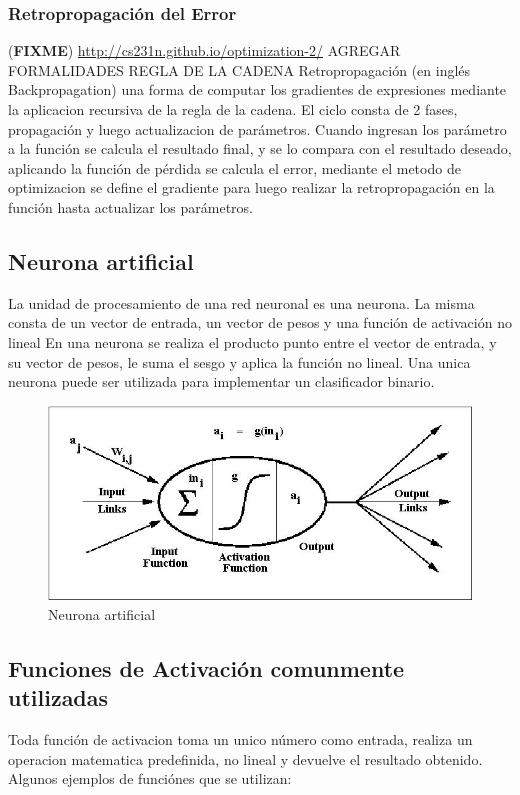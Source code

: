 \documentclass[a4paper,11pt,spanish]{book}
\newcommand*{\FIXME}[1]{{(\textbf{FIXME}) {#1}}}
\begin{document}
	\subsubsection{Retropropagación del Error}
	  \FIXME{\url{http://cs231n.github.io/optimization-2/} AGREGAR FORMALIDADES REGLA DE LA CADENA}
	  Retropropagación (en inglés Backpropagation) una forma  de computar los gradientes de expresiones mediante la aplicacion recursiva de la regla de la cadena.
	  El ciclo consta de 2 fases, propagación y luego actualizacion de parámetros. Cuando ingresan los parámetro a la función se calcula el resultado final, y se lo compara con el resultado
	  deseado, aplicando la función de pérdida se calcula el error, mediante el metodo de optimizacion se define el gradiente para luego realizar la retropropagación en la función hasta
	  actualizar los parámetros.

      \subsection {Neurona artificial}
	La unidad de procesamiento de una red neuronal es una neurona. La misma consta de un vector de entrada, un vector de pesos y una función de activación no lineal
	En una neurona se realiza el producto punto entre el vector de entrada, y su vector de pesos, le suma el sesgo y aplica la función no lineal.
	Una unica neurona puede ser utilizada para implementar un clasificador binario.
	\begin{figure}[H]
          \begin{center}
            \includegraphics[width=0.4\linewidth]{./img/neuron.jpg}
	  \caption{Neurona artificial}
          \end{center}
          \label{fig:neuron}
	\end{figure}


      \subsection {Funciones de Activación comunmente utilizadas}
	Toda función de activacion toma un unico número como entrada, realiza un operacion matematica predefinida, no lineal y devuelve el resultado obtenido.
	Algunos ejemplos de funciónes que se utilizan:
\end{document}
